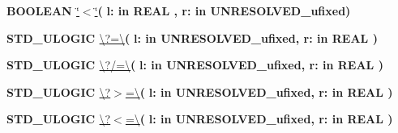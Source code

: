 \begin{DoxyCompactItemize}
\item 
{\bfseries {\bfseries \textcolor{comment}{B\+O\+O\+L\+E\+A\+N}\textcolor{vhdlchar}{ }}} \hyperlink{classfixed__pkg_a5d059cf3277e3585e4f3f076db10b273}{\char`\"{}$<$\char`\"{}}{\bfseries  ( }{\bfseries \textcolor{vhdlchar}{l\+: }\textcolor{stringliteral}{in }{\bfseries \textcolor{comment}{R\+E\+A\+L}\textcolor{vhdlchar}{ }}}{\bfseries  , \textcolor{vhdlchar}{r\+: }\textcolor{stringliteral}{in }\textcolor{vhdlchar}{U\+N\+R\+E\+S\+O\+L\+V\+E\+D\+\_\+ufixed}}{\bfseries  )} 
\item 
{\bfseries {\bfseries \textcolor{comment}{S\+T\+D\+\_\+\+U\+L\+O\+G\+I\+C}\textcolor{vhdlchar}{ }}} \hyperlink{classfixed__pkg_a69151531d87456d952c2073704fa1779}{\textbackslash{}?=\textbackslash{}}{\bfseries  ( }{\bfseries \textcolor{vhdlchar}{l\+: }\textcolor{stringliteral}{in }\textcolor{vhdlchar}{U\+N\+R\+E\+S\+O\+L\+V\+E\+D\+\_\+ufixed}}{\bfseries  , \textcolor{vhdlchar}{r\+: }\textcolor{stringliteral}{in }{\bfseries \textcolor{comment}{R\+E\+A\+L}\textcolor{vhdlchar}{ }}}{\bfseries  )} 
\item 
{\bfseries {\bfseries \textcolor{comment}{S\+T\+D\+\_\+\+U\+L\+O\+G\+I\+C}\textcolor{vhdlchar}{ }}} \hyperlink{classfixed__pkg_a172a73302b09f0d298b93ecda8c5e976}{\textbackslash{}?/=\textbackslash{}}{\bfseries  ( }{\bfseries \textcolor{vhdlchar}{l\+: }\textcolor{stringliteral}{in }\textcolor{vhdlchar}{U\+N\+R\+E\+S\+O\+L\+V\+E\+D\+\_\+ufixed}}{\bfseries  , \textcolor{vhdlchar}{r\+: }\textcolor{stringliteral}{in }{\bfseries \textcolor{comment}{R\+E\+A\+L}\textcolor{vhdlchar}{ }}}{\bfseries  )} 
\item 
{\bfseries {\bfseries \textcolor{comment}{S\+T\+D\+\_\+\+U\+L\+O\+G\+I\+C}\textcolor{vhdlchar}{ }}} \hyperlink{classfixed__pkg_a3adee8c12e5c0bb76fc3e1a493284a27}{\textbackslash{}?$>$=\textbackslash{}}{\bfseries  ( }{\bfseries \textcolor{vhdlchar}{l\+: }\textcolor{stringliteral}{in }\textcolor{vhdlchar}{U\+N\+R\+E\+S\+O\+L\+V\+E\+D\+\_\+ufixed}}{\bfseries  , \textcolor{vhdlchar}{r\+: }\textcolor{stringliteral}{in }{\bfseries \textcolor{comment}{R\+E\+A\+L}\textcolor{vhdlchar}{ }}}{\bfseries  )} 
\item 
{\bfseries {\bfseries \textcolor{comment}{S\+T\+D\+\_\+\+U\+L\+O\+G\+I\+C}\textcolor{vhdlchar}{ }}} \hyperlink{classfixed__pkg_a271da29f659a2bc9480dbd29d7727913}{\textbackslash{}?$<$=\textbackslash{}}{\bfseries  ( }{\bfseries \textcolor{vhdlchar}{l\+: }\textcolor{stringliteral}{in }\textcolor{vhdlchar}{U\+N\+R\+E\+S\+O\+L\+V\+E\+D\+\_\+ufixed}}{\bfseries  , \textcolor{vhdlchar}{r\+: }\textcolor{stringliteral}{in }{\bfseries \textcolor{comment}{R\+E\+A\+L}\textcolor{vhdlchar}{ }}}{\bfseries  )} 

\end{DoxyCompactItemize}
